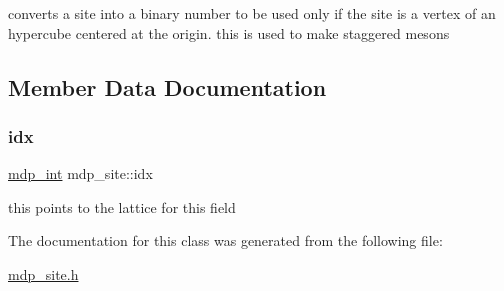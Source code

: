 converts a site into a binary number to be used only if the site is a vertex of an hypercube centered at the origin. this is used to make staggered mesons 

\subsection{Member Data Documentation}
\mbox{\label{classmdp__site_a28354e929a397ee9b0030abe2583b29b}} 
\subsubsection{\texorpdfstring{idx}{idx}}
{\footnotesize\ttfamily \hyperlink{mdp__global__vars_8h_aaa1ad9d0dcd2124aa5af0120d9954174}{mdp\+\_\+int} mdp\+\_\+site\+::idx}



this points to the lattice for this field 



The documentation for this class was generated from the following file\+:\begin{DoxyCompactItemize}
\item 
\hyperlink{mdp__site_8h}{mdp\+\_\+site.\+h}\end{DoxyCompactItemize}
